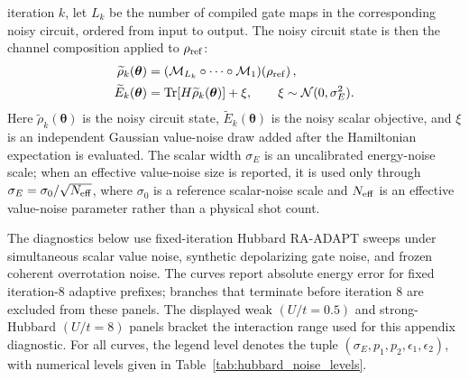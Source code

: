 \documentclass[
  reprint,
  amsmath,
  amssymb,
  aps,
  pra,
  nofootinbib,
  superscriptaddress,
  floatfix
]{revtex4-2}
\begin{document}
iteration \(k\), let \(L_k\) be the number of compiled gate maps in the
corresponding noisy circuit, ordered from input to output. The noisy circuit
state is then the channel composition applied to \(\rho_{\rm ref}\):
\begin{equation*}
\begin{aligned}
\widetilde\rho_k(\boldsymbol{\theta})
&=
\left(\mathcal M_{L_k}\circ\cdots\circ\mathcal M_1\right)
\!\left(\rho_{\rm ref}\right),
\\
\widetilde E_k(\boldsymbol{\theta})
&=
\operatorname{Tr}\!\left[
H\widetilde\rho_k(\boldsymbol{\theta})
\right]
+\xi,
\qquad
\xi\sim\mathcal N(0,\sigma_E^2).
\end{aligned}
\end{equation*}
Here \(\widetilde\rho_k(\boldsymbol{\theta})\) is the noisy circuit state,
\(\widetilde E_k(\boldsymbol{\theta})\) is the noisy scalar objective, and
\(\xi\) is an independent Gaussian value-noise draw added after the Hamiltonian
expectation is evaluated. The scalar width \(\sigma_E\) is an uncalibrated
energy-noise scale; when an effective value-noise size is reported, it is used
only through \(\sigma_E=\sigma_0/\sqrt{N_{\rm eff}}\), where \(\sigma_0\) is a
reference scalar-noise scale and \(N_{\rm eff}\) is an effective value-noise
parameter rather than a physical shot count.

The diagnostics below use fixed-iteration Hubbard RA-ADAPT sweeps under simultaneous scalar value noise, synthetic depolarizing gate noise, and frozen coherent overrotation noise. The curves report absolute energy error for fixed iteration-8 adaptive prefixes; branches that terminate before iteration 8 are excluded from these panels. The displayed weak \((U/t=0.5)\) and strong-Hubbard \((U/t=8)\) panels bracket the interaction range used for this appendix diagnostic. For all curves, the legend level denotes the tuple \((\sigma_E,p_1,p_2,\epsilon_1,\epsilon_2)\), with numerical levels given in Table~\ref{tab:hubbard_noise_levels}.
\end{document}

